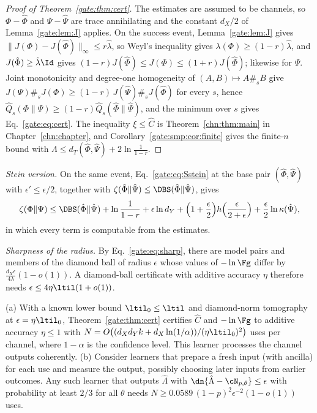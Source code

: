 \begin{proof}[Proof of Theorem~\ref{gate:thm:cert}]
The estimates are assumed to be channels, so $\Phi-\hat\Phi$ and $\Psi-\hat\Psi$ are trace annihilating and the constant $d_X/2$ of Lemma~\ref{gate:lem:J} applies. On the success event, Lemma~\ref{gate:lem:J} gives $\|J(\Phi)-J(\hat\Phi)\|_\infty\le r\hat\lambda$, so Weyl's inequality gives $\lambda(\Phi)\ge(1-r)\hat\lambda$, and $J(\hat\Phi)\ge\hat\lambda\Id$ gives $(1-r)J(\hat\Phi)\le J(\Phi)\le(1+r)J(\hat\Phi)$; likewise for $\Psi$. Joint monotonicity and degree-one homogeneity of $(A,B)\mapsto A\#_sB$ give $J(\Psi)\#_sJ(\Phi)\ge(1-r)\,J(\hat\Psi)\#_sJ(\hat\Phi)$ for every $s$, hence $\hat Q_s(\Phi\|\Psi)\ge(1-r)\hat Q_s(\hat\Phi\|\hat\Psi)$, and the minimum over $s$ gives Eq.~\eqref{gate:eq:cert}. The inequality $\xi\le\hat C$ is Theorem~\ref{chn:thm:main} in Chapter~\ref{chn:chapter}, and Corollary~\ref{gate:smp:cor:finite} gives the finite-$n$ bound with $\Lambda\le d_T(\hat\Phi,\hat\Psi)+2\ln\frac1{1-r}$.
\end{proof}

\emph{Stein version.} On the same event, Eq.~\eqref{gate:eq:Sstein} at the base pair $(\hat\Phi,\hat\Psi)$ with $\epsilon'\le\epsilon/2$, together with $\zeta(\hat\Phi\|\hat\Psi)\le\DBS(\hat\Phi\|\hat\Psi)$, gives
\begin{equation}
\zeta(\Phi\|\Psi)\le\DBS(\hat\Phi\|\hat\Psi)+\ln\frac1{1-r}+\epsilon\ln d_Y+\Big(1+\frac\epsilon2\Big)h\Big(\frac{\epsilon}{2+\epsilon}\Big)+\frac\epsilon2\ln\kappa(\hat\Psi),
\end{equation}
in which every term is computable from the estimates.

\emph{Sharpness of the radius.} By Eq.~\eqref{gate:eq:sharp}, there are model pairs and members of the diamond ball of radius $\epsilon$ whose values of $-\ln\Fg$ differ by $\frac{d_X\epsilon}{4\lambda}(1-o(1))$. A diamond-ball certificate with additive accuracy $\eta$ therefore needs $\epsilon\le4\eta\ltil(1+o(1))$.

\begin{proposition}\label{gate:prop:N12}
(a) With a known lower bound $\ltil_0\le\ltil$ and diamond-norm tomography~\cite{MeleBittel2025} at $\epsilon=\eta\ltil_0$, Theorem~\ref{gate:thm:cert} certifies $\hat C$ and $-\ln\Fg$ to additive accuracy $\eta\le1$ with $N=O\big((d_Xd_Yk+d_X\ln(1/\alpha))/(\eta\ltil_0)^2\big)$ uses per channel, where $1-\alpha$ is the confidence level. This learner processes the channel outputs coherently. (b) Consider learners that prepare a fresh input (with ancilla) for each use and measure the output, possibly choosing later inputs from earlier outcomes. Any such learner that outputs $\hat\Lambda$ with $\dn{\hat\Lambda-\cN_{p,\theta}}\le\epsilon$ with probability at least $2/3$ for all $\theta$ needs $N\ge0.0589\,(1-p)^2\epsilon^{-2}(1-o(1))$ uses.
\end{proposition}

